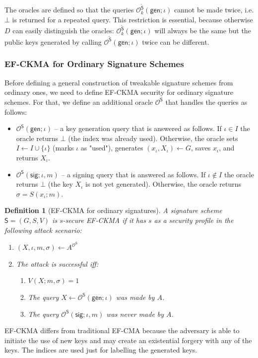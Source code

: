 \documentclass{article}
\newtheorem{definition}{Definition}[section]
\begin{document}
The oracles are defined so that the queries
$\mathcal{O}^{\tilde{\mathsf{S}}}_k(\mathsf{gen};\iota)$ cannot be made twice, i.e. $\bot$ is returned for a repeated query. This restriction is essential, because otherwise $D$ can easily distinguish the oracles: $\mathcal{O}^{\tilde{\mathsf{S}}}_k(\mathsf{gen};\iota)$ will always be the same but the public keys generated by calling $\mathcal{O}^{\tilde{\mathsf{S}}}(\mathsf{gen};\iota)$ twice can be different.

\subsubsection{EF-CKMA for Ordinary Signature Schemes}\label{sec:efckma-ordinary}
Before defining a general construction of tweakable signature schemes from ordinary ones, we need to define EF-CKMA security for ordinary signature schemes. For that, we define an additional oracle $\mathcal{O}^{\mathsf{S}}$ that handles the
queries as follows:
\begin{itemize}
\item $\mathcal{O}^{\mathsf{S}}(\mathsf{gen};\iota)$ -- a key generation query that is answered as follows. If $\iota\in I$ the  oracle returns $\bot$ (the index was already used). Otherwise, the oracle sets $I\gets I\cup \{\iota\}$ (marks $\iota$ as "used"), generates $(x_\iota,X_\iota)\gets G$, saves $x_\iota$, and returns $X_\iota$.
\item $\mathcal{O}^{\mathsf{S}}(\mathsf{sig};\iota,m)$ -- a signing query that is answered as follows. If $\iota\not\in I$ the  oracle returns $\bot$ (the key $X_\iota$ is not yet generated). Otherwise, the oracle returns $\sigma=S(x_\iota;m)$.
\end{itemize}



\begin{definition}[EF-CKMA for ordinary signatures]\label{def:efckma-ordinary}
A signature scheme $\mathsf{S}=(G,S,V)$ is $s$-secure EF-CKMA if it has $s$ as a security profile in the following attack scenario:
\begin{enumerate}
\item $(X,\iota,m,\sigma)\gets A^{\mathcal{O}^{\mathsf{S}}}$
\item The attack is successful iff:
\begin{enumerate}
\item $V(X;m,\sigma)=1$
\item The query $X\gets \mathcal{O}^{\mathsf{S}}(\mathsf{gen};\iota)$ was made by $A$.
\item The query $\mathcal{O}^{\mathsf{S}}(\mathsf{sig};\iota,m)$ was never made by $A$.
\end{enumerate}
\end{enumerate}
\end{definition}
EF-CKMA differs from traditional EF-CMA because the adversary is able to initiate the use of new keys and may create an existential forgery with any of the keys. The indices are used just for labelling the generated keys.
\end{document}
